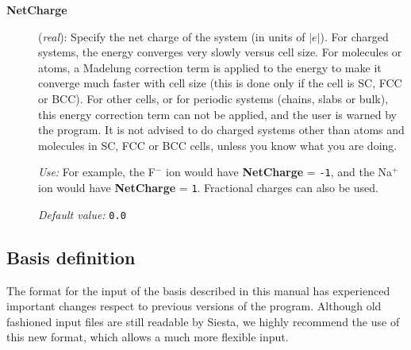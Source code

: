 \documentclass[11pt]{article}
\begin{document}
\begin{description}
\item[{\bf NetCharge}] ({\it real}): 
Specify the net charge of the system (in units of $|e|$). 
For charged systems, the energy converges very slowly
versus cell size. For molecules or atoms, a Madelung
correction term is applied to the energy to make it converge
much faster with cell size (this is done only if
the cell is SC, FCC or BCC). For other cells, or for 
periodic systems (chains, slabs or bulk), this energy
correction term can not be applied, and the user is warned
by the program.   It is not advised to do charged systems
other than atoms and molecules in SC, FCC or BCC cells,
unless you know what you are doing.

{\it Use:} 
For example, the F$^-$ ion would have {\bf NetCharge} = {\tt -1},
and the Na$^+$ ion would have {\bf NetCharge} = {\tt 1}.
Fractional charges can also be used.

{\it Default value:} {\tt 0.0} 


\end{description}


\vspace{5pt}
\subsection{Basis definition}

\noindent 
The format for the input of the basis described in this manual
has experienced important changes respect to 
previous versions of the program. Although old fashioned 
input files are
still readable by {\sc Siesta}, we highly recommend the use of this
new format, which allows a much more flexible input.
\end{document}
